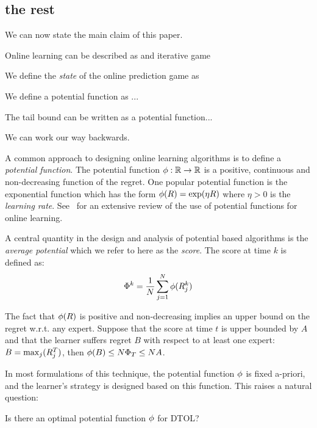 \documentclass[12pt]{article} %
\begin{document}
\subsection{the rest}

We can now state the main claim of this paper.


Online learning can be described as and iterative game~\cite{}

We define the {\em state} of the online prediction game as

We define a potential function as ...

The tail bound can be written as a potential function...

We can work our way backwards.

A common approach to designing online learning algorithms is to define
a {\em potential function}. The potential function
$\phi:\mathbb{R} \to \mathbb{R}$ is a
positive, continuous and non-decreasing function of the regret.
One popular potential function is the exponential function
which has the form $\phi(R) = \exp(\eta R)$ where $\eta>0$
is the {\em learning rate}. See~\cite{cesa2006prediction} for an
extensive review of the use of potential functions for online learning.

A central quantity in the design and analysis of potential based
algorithms is the {\em average potential} which we refer to here as the {\em
  score}. The score at time $k$ is defined as:
\begin{equation} \label{eqn:score}
  \Phi^k = \frac{1}{N} \sum_{j=1}^N \phi(R_j^k)
\end{equation}

The fact that $\phi(R)$ is positive and non-decreasing implies an upper
bound on the regret w.r.t. any expert.
Suppose that the score at time $t$ is upper bounded by $A$ and that the learner
suffers regret $B$ with respect to at least one expert:
$B=\max_j(R_j^T)$, then  $\phi(B) \leq N \Phi_T \leq NA$.

In most formulations of this technique, the potential function $\phi$ is
fixed a-priori, and the learner's strategy is designed based on this function.
This raises a natural question:
\begin{question} \label{quest:optimality}
  Is there an optimal potential function $\phi$ for DTOL?
\end{question}
\end{document}
